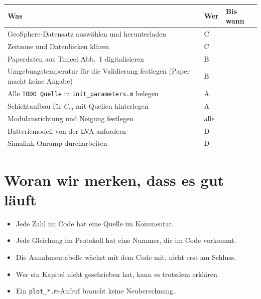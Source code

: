 \documentclass[11pt,a4paper]{scrartcl}
\newcommand{\Cm}{C_\mathrm{m}}
\begin{document}
\begin{longtable}{p{} l l}
  \toprule
  Was & Wer & Bis wann \\
  \midrule
  \endhead
  GeoSphere-Datensatz ausw\"ahlen und herunterladen & C & \\
  Zeitzone und Datenl\"ucken kl\"aren & C & \\
  Paperdaten aus Tuncel Abb.~1 digitalisieren & B & \\
  Umgebungstemperatur f\"ur die Validierung festlegen (Paper macht keine Angabe) & B & \\
  Alle \texttt{TODO Quelle} in \texttt{init\_parameters.m} belegen & A & \\
  Schichtaufbau f\"ur $\Cm$ mit Quellen hinterlegen & A & \\
  Modulausrichtung und Neigung festlegen & alle & \\
  Batteriemodell von der LVA anfordern & D & \\
  Simulink-Onramp durcharbeiten & D & \\
  \bottomrule
\end{longtable}

\section{Woran wir merken, dass es gut l\"auft}

\begin{itemize}
  \item Jede Zahl im Code hat eine Quelle im Kommentar.
  \item Jede Gleichung im Protokoll hat eine Nummer, die im Code vorkommt.
  \item Die Annahmentabelle w\"achst mit dem Code mit, nicht erst am Schluss.
  \item Wer ein Kapitel nicht geschrieben hat, kann es trotzdem erkl\"aren.
  \item Ein \texttt{plot\_*.m}-Aufruf braucht keine Neuberechnung.
\end{itemize}
\end{document}
